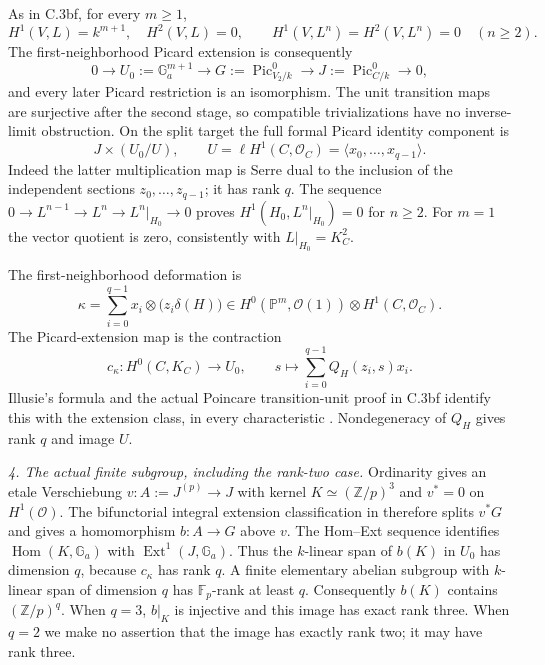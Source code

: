 As in C.3bf, for every $m\ge1$,
\[
 H^1(V,L)=k^{m+1},\quad H^2(V,L)=0,\qquad
 H^1(V,L^n)=H^2(V,L^n)=0\quad(n\ge2).
\]
The first-neighborhood Picard extension is consequently
\[
 0\longrightarrow U_0:=\mathbb G_a^{m+1}
 \longrightarrow G:=\operatorname{Pic}^0_{V_2/k}
 \longrightarrow J:=\operatorname{Pic}^0_{C/k}\longrightarrow0,
\]
and every later Picard restriction is an isomorphism. The unit
transition maps are surjective after the second stage, so compatible
trivializations have no inverse-limit obstruction.
On the split target the full formal Picard identity component is
\[
 J\times(U_0/U),\qquad
 U=\ell H^1(C,\mathcal O_C)=\langle x_0,\ldots,x_{q-1}\rangle.
\]
Indeed the latter multiplication map is Serre dual to the inclusion
of the independent sections $z_0,\ldots,z_{q-1}$; it has rank $q$.
The sequence $0\to L^{n-1}\to L^n\to L^n|_{H_0}\to0$ proves
$H^1(H_0,L^n|_{H_0})=0$ for $n\ge2$. For $m=1$ the vector quotient
is zero, consistently with $L|_{H_0}=K_C^2$.

The first-neighborhood deformation is
\[
 \kappa=\sum_{i=0}^{q-1}x_i\otimes
             \bigl(z_i\delta(H)\bigr)
 \in H^0(\mathbb P^m,\mathcal O(1))\otimes H^1(C,\mathcal O_C).
\]
The Picard-extension map is the contraction
\[
 c_\kappa:H^0(C,K_C)\longrightarrow U_0,
 \qquad s\longmapsto\sum_{i=0}^{q-1}Q_H(z_i,s)x_i.
\]
Illusie's formula and the actual Poincare transition-unit proof in
C.3bf identify this with the extension class, in every characteristic
\citep[Theorem2.6 and formula(2.7.2), pp.~166--167]{D_Illusie1972Torsors}.
Nondegeneracy of $Q_H$ gives rank $q$ and image $U$.

\emph{4. The actual finite subgroup, including the rank-two case.}
Ordinarity gives an etale Verschiebung
$v:A:=J^{(p)}\to J$ with kernel $K\simeq(\mathbb Z/p)^3$ and
$v^*=0$ on $H^1(\mathcal O)$. The bifunctorial integral extension
classification in \citet[equation(3.8), Section3.2.3, p.~23]{D_BrionIsogenyII}
therefore splits $v^*G$ and gives a homomorphism $b:A\to G$ above $v$.
The Hom--Ext sequence identifies
$\operatorname{Hom}(K,\mathbb G_a)$ with
$\operatorname{Ext}^1(J,\mathbb G_a)$. Thus the $k$-linear span of
$b(K)$ in $U_0$ has dimension $q$, because $c_\kappa$ has rank $q$.
A finite elementary abelian subgroup with $k$-linear span of dimension
$q$ has $\mathbb F_p$-rank at least $q$. Consequently $b(K)$ contains
$(\mathbb Z/p)^q$. When $q=3$, $b|_K$ is injective and this image has
exact rank three. When $q=2$ we make no assertion that the image has
exactly rank two; it may have rank three.

